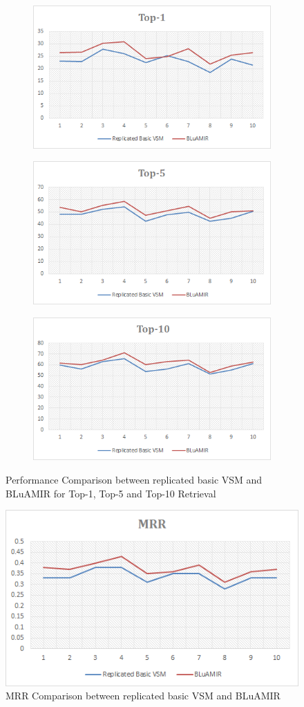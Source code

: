 \documentclass[conference]{IEEEtran}
\begin{document}
\begin{figure}
	\begin{subfigure}
		\centering
		\includegraphics[width=.33\textwidth]{VSM+AssoTop-1}
	\end{subfigure}
	\begin{subfigure} 
		\centering
		\includegraphics[width=.33\textwidth]{VSM+AssoTop-5}
	\end{subfigure}
	\begin{subfigure} 
		\centering
		\includegraphics[width=.33\textwidth]{VSM+AssoTop-10}
	\end{subfigure}
	
	\caption {Performance Comparison between replicated basic VSM and BLuAMIR for Top-1, Top-5 and Top-10 Retrieval}
	\label{fig:VSM+AssoTopK}
\end{figure}
\begin{figure}
	\centering
	\includegraphics[scale=0.70]{VSM+AssoTop-MRR}
	\caption {MRR Comparison between replicated basic VSM and BLuAMIR}
	\label{fig:VSM+AssoTop-MRR}
\end{figure}
\end{document}
